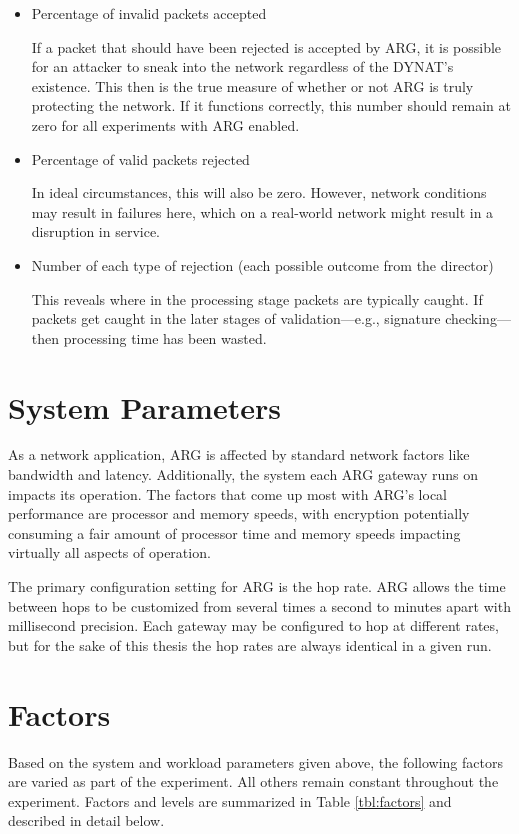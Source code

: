 \begin{itemize}
\item Percentage of invalid packets accepted

	If a packet that should have been rejected is accepted by \ac{ARG}, it is possible for an attacker to sneak into the network regardless of the \ac{DYNAT}'s existence. This then is the true measure of whether or not \ac{ARG} is truly protecting the network. If it functions correctly, this number should remain at zero for all experiments with \ac{ARG} enabled.

\item Percentage of valid packets rejected
	\par In ideal circumstances, this will also be zero. However, network conditions may result in failures here, which on a real-world network might result in a disruption in service. 

\item Number of each type of rejection (each possible outcome from the director)
	\par This reveals where in the processing stage packets are typically caught. If packets get caught in the later stages of validation---e.g., signature checking---then processing time has been wasted.
\end{itemize}

\section{System Parameters}
\label{sec:parameters}
\par As a network application, \ac{ARG} is affected by standard network factors like bandwidth and latency. Additionally, the system each \ac{ARG} gateway runs on impacts its operation. The factors that come up most with \ac{ARG}'s local performance are processor and memory speeds, with encryption potentially consuming a fair amount of processor time and memory speeds impacting virtually all aspects of operation.

\par The primary configuration setting for \ac{ARG} is the hop rate. \ac{ARG} allows the time between hops to be customized from several times a second to minutes apart with millisecond precision. Each gateway may be configured to hop at different rates, but for the sake of this thesis the hop rates are always identical in a given run.

\section{Factors}
\FloatBarrier
\label{sec:factors}
\par Based on the system and workload parameters given above, the following factors are varied as part of the experiment. All others remain constant throughout the experiment. Factors and levels are summarized in Table \ref{tbl:factors} and described in detail below.

